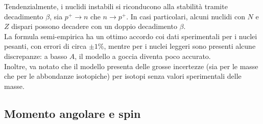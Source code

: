 Tendenzialmente, i nuclidi instabili si riconducono alla stabilità tramite decadimento $ \beta $, sia $ p^+ \rightarrow n $ che $ n \rightarrow p^+ $. In casi particolari, alcuni nuclidi con $ N $ e $ Z $ dispari possono decadere con un doppio decadimento $ \beta $.\\
La formula semi-empirica ha un ottimo accordo coi dati sperimentali per i nuclei pesanti, con errori di circa $ \pm 1\% $, mentre per i nuclei leggeri sono presenti alcune discrepanze: a basso $ A $, il modello a goccia diventa poco accurato.\\
Inoltre, va notato che il modello presenta delle grosse incertezze (sia per le masse che per le abbondanze isotopiche) per isotopi senza valori sperimentali delle masse.

\subsection{Momento angolare e spin}











